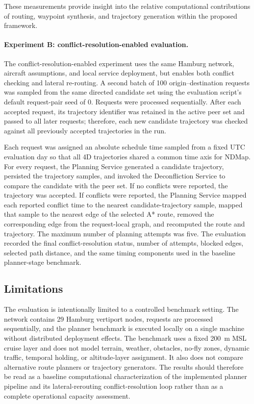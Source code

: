 These measurements provide insight into the relative computational contributions of routing, waypoint synthesis, and trajectory generation within the proposed framework.

\paragraph{Experiment B: conflict-resolution-enabled evaluation.}
The conflict-resolution-enabled experiment uses the same Hamburg network, aircraft assumptions, and local service deployment, but enables both conflict checking and lateral re-routing. A second batch of 100 origin--destination requests was sampled from the same directed candidate set using the evaluation script's default request-pair seed of 0. Requests were processed sequentially. After each accepted request, its trajectory identifier was retained in the active peer set and passed to all later requests; therefore, each new candidate trajectory was checked against all previously accepted trajectories in the run.

Each request was assigned an absolute schedule time sampled from a fixed UTC evaluation day so that all 4D trajectories shared a common time axis for NDMap. For every request, the Planning Service generated a candidate trajectory, persisted the trajectory samples, and invoked the Deconfliction Service to compare the candidate with the peer set. If no conflicts were reported, the trajectory was accepted. If conflicts were reported, the Planning Service mapped each reported conflict time to the nearest candidate-trajectory sample, mapped that sample to the nearest edge of the selected A* route, removed the corresponding edge from the request-local graph, and recomputed the route and trajectory. The maximum number of planning attempts was five. The evaluation recorded the final conflict-resolution status, number of attempts, blocked edges, selected path distance, and the same timing components used in the baseline planner-stage benchmark.

\subsection{Limitations}
\label{sec:limitations}

The evaluation is intentionally limited to a controlled benchmark setting. The network contains 29 Hamburg vertiport nodes, requests are processed sequentially, and the planner benchmark is executed locally on a single machine without distributed deployment effects. The benchmark uses a fixed \SI{200}{m} MSL cruise layer and does not model terrain, weather, obstacles, no-fly zones, dynamic traffic, temporal holding, or altitude-layer assignment. It also does not compare alternative route planners or trajectory generators. The results should therefore be read as a baseline computational characterization of the implemented planner pipeline and its lateral-rerouting conflict-resolution loop rather than as a complete operational capacity assessment.
